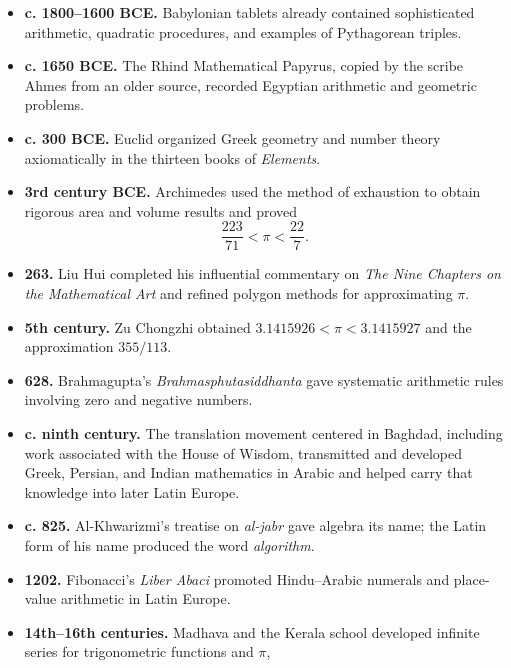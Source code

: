     \begin{itemize}
        \item \textbf{c. 1800--1600 BCE.} Babylonian tablets already contained
              sophisticated arithmetic, quadratic procedures, and examples of
              Pythagorean triples.
        \item \textbf{c. 1650 BCE.} The Rhind Mathematical Papyrus, copied by
              the scribe Ahmes from an older source, recorded Egyptian
              arithmetic and geometric problems.
        \item \textbf{c. 300 BCE.} Euclid organized Greek geometry and number
              theory axiomatically in the thirteen books of
              \textit{Elements}.
        \item \textbf{3rd century BCE.} Archimedes used the method of exhaustion
              to obtain rigorous area and volume results and proved
              \[
                  \frac{223}{71}<\pi<\frac{22}{7}.
              \]
        \item \textbf{263.} Liu Hui completed his influential commentary on
              \textit{The Nine Chapters on the Mathematical Art} and refined
              polygon methods for approximating $\pi$.
        \item \textbf{5th century.} Zu Chongzhi obtained
              $3.1415926<\pi<3.1415927$ and the approximation
              $355/113$.
        \item \textbf{628.} Brahmagupta's
              \textit{Brahmasphutasiddhanta} gave systematic arithmetic rules
              involving zero and negative numbers.
        \item \textbf{c. ninth century.} The translation movement centered in
              Baghdad, including work associated with the House of Wisdom,
              transmitted and developed Greek, Persian, and Indian mathematics
              in Arabic and helped carry that knowledge into later Latin Europe.
        \item \textbf{c. 825.} Al-Khwarizmi's treatise on
              \emph{al-jabr} gave algebra its name; the Latin form of his name
              produced the word \emph{algorithm}.
        \item \textbf{1202.} Fibonacci's \textit{Liber Abaci} promoted
              Hindu--Arabic numerals and place-value arithmetic in Latin
              Europe.
        \item \textbf{14th--16th centuries.} Madhava and the Kerala school
              developed infinite series for trigonometric functions and $\pi$,

\end{itemize}
